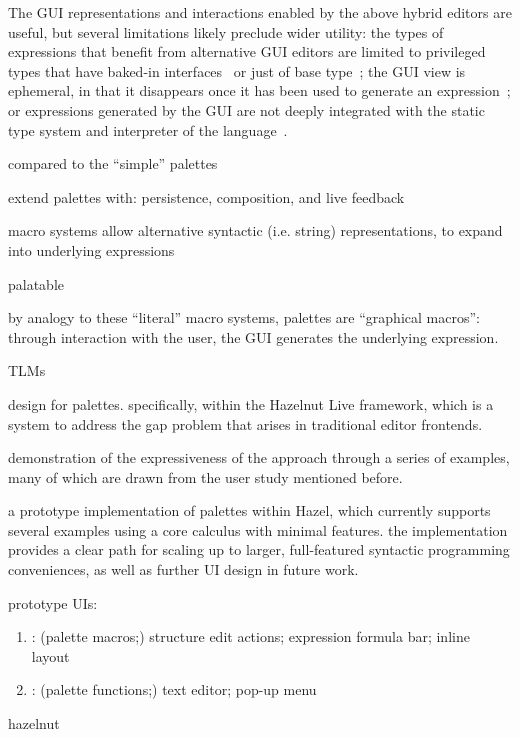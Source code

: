 The GUI representations and interactions enabled by the above hybrid editors are
useful, but several limitations likely preclude wider utility:
%
the types of expressions that benefit from alternative GUI editors are limited
to
%
privileged types that have baked-in interfaces~\citep{XXX}
%
or just of base type~\citep{XXX};
%
the GUI view is ephemeral, in that it disappears once it has been used to
generate an expression~\citep{XXX}; or
%
expressions generated by the GUI are not deeply integrated with the static type
system and interpreter of the language~\citep{XXX,XXX,XXX}.





compared to the ``simple'' palettes

extend palettes with: persistence, composition, and live feedback

macro systems allow alternative syntactic (i.e. string) representations, to
expand into underlying expressions

palatable

by analogy to these ``literal'' macro systems, palettes are ``graphical
macros'': through interaction with the user, the GUI generates the underlying
expression.

TLMs~\cite{TLMs}




design for palettes. specifically, within the Hazelnut Live framework,
which is a system to address the gap problem that arises in traditional editor
frontends.

demonstration of the expressiveness of the approach through a series of
examples, many of which are drawn from the user study mentioned before.

a prototype implementation of palettes within Hazel, which currently
supports several examples using a core calculus with minimal features. the
implementation provides a clear path for scaling up to larger, full-featured
syntactic programming conveniences, as well as further UI design in future work.

prototype UIs:

  \begin{enumerate}
    \item \Hazel{}: (palette macros;) structure edit actions; expression formula bar; inline layout
    \item \sns{}: (palette functions;) text editor; pop-up menu
  \end{enumerate}

hazelnut~\citep{Hazelnut,HazelnutLive}



